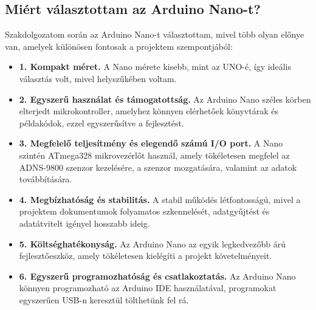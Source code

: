 \documentclass[]{thesis-ekf}
\theoremstyle{definition}
\theoremstyle{remark}
\begin{document}
\subsection{Miért választottam az Arduino Nano-t?}
Szakdolgozatom során az Arduino Nano-t választottam, mivel több olyan előnye van, amelyek különösen fontosak a projektem szempontjából:

\begin{itemize}
	\item \textbf{1. Kompakt méret.} A Nano mérete kisebb, mint az UNO-é, így ideális választás volt, mivel helyszűkében voltam.
	\item \textbf{2. Egyszerű használat és támogatottság.} Az Arduino Nano széles körben elterjedt mikrokontroller, amelyhez könnyen elérhetőek könyvtárak és példakódok, ezzel egyszerűsítve a fejlesztést.
	\item \textbf{3. Megfelelő teljesítmény és elegendő számú I/O port.} A Nano szintén ATmega328 mikrovezérlőt használ, amely tökéletesen megfelel az ADNS-9800 szenzor kezelésére, a szenzor mozgatására, valamint az adatok továbbítására.
	\item \textbf{4. Megbízhatóság és stabilitás.} A stabil működés létfontosságú, mivel a projektem dokumentumok folyamatos szkennelését, adatgyűjtést és adatátvitelt igényel hosszabb ideig.
	\item \textbf{5. Költséghatékonyság.} Az Arduino Nano az egyik legkedvezőbb árú fejlesztőeszköz, amely tökéletesen kielégíti a projekt követelményeit.
	\item \textbf{6. Egyszerű programozhatóság és csatlakoztatás.} Az Arduino Nano könnyen programozható az Arduino IDE használatával, programokat egyszerűen USB-n keresztül tölthetünk fel rá.
\end{itemize}
\end{document}

